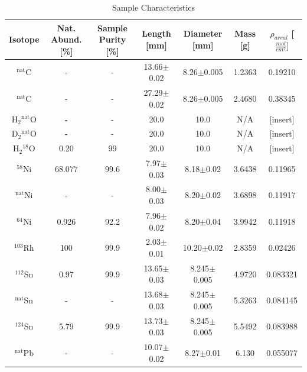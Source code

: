\documentclass[twocolumn,secnumarabic,amssymb, nobibnotes, aps, prl,
superscriptaddress, nobalancelastpage]{revtex4}
\begin{document}
\begin{table}[ht]
    \caption{Sample Characteristics}
    \label{SampleTable}
    \begin{center}
        \begin{tabular}{ c c c c c c c }
            \hline
            Isotope & Nat. Abund. [\%] & Sample Purity [\%] & Length [mm] & Diameter
            [mm] & Mass [g] & $\rho_{areal}$ [$\frac{mol}{cm^{2}}]$\\
            \hline

            $^{\text{nat}}$C & - & - & 13.66$\pm$0.02 & 8.26$\pm$0.005 & 1.2363
            & 0.19210 \\
            $^{\text{nat}}$C & - & - & 27.29$\pm$0.02 & 8.26$\pm$0.005 & 2.4680
            & 0.38345\\

            H$_{2}$$^{\text{nat}}$O & - & - & 20.0 & 10.0 & N/A & [insert]\\
            D$_{2}$$^{\text{nat}}$O & - & - & 20.0 & 10.0 & N/A & [insert]\\
            H$_{2}$$^{18}$O & 0.20 & 99 & 20.0 & 10.0 & N/A & [insert]\\

            $^{58}$Ni & 68.077 & 99.6 & 7.97$\pm$0.03 & 8.18$\pm$0.02 &
            3.6438 & 0.11965\\
            $^{\text{nat}}$Ni & - & - & 8.00$\pm$0.03 & 8.20$\pm$0.02 &
            3.6898 & 0.11917\\
            $^{64}$Ni & 0.926 & 92.2 & 7.96$\pm$0.02 & 8.20$\pm$0.04 &
            3.9942 & 0.11918\\

            $^{103}$Rh & 100 & 99.9 & 2.03$\pm$0.01 & 10.20$\pm$0.02 & 2.8359 & 0.02426\\

            $^{112}$Sn & 0.97 & 99.9 & 13.65$\pm$0.03 & 8.245$\pm$0.005 &
            4.9720 & 0.083321\\
            $^{\text{nat}}$Sn & - & - & 13.68$\pm$0.03 & 8.245$\pm$0.005 &
            5.3263 & 0.084145\\
            $^{124}$Sn & 5.79 & 99.9 & 13.73$\pm$0.03 & 8.245$\pm$0.005 &
            5.5492 & 0.083988\\

            $^{\text{nat}}$Pb & - & - & 10.07$\pm$0.02 & 8.27$\pm$0.01 & 6.130 &
            0.055077\\

            \hline
        \end{tabular}
    \end{center}
\end{table}
\end{document}
